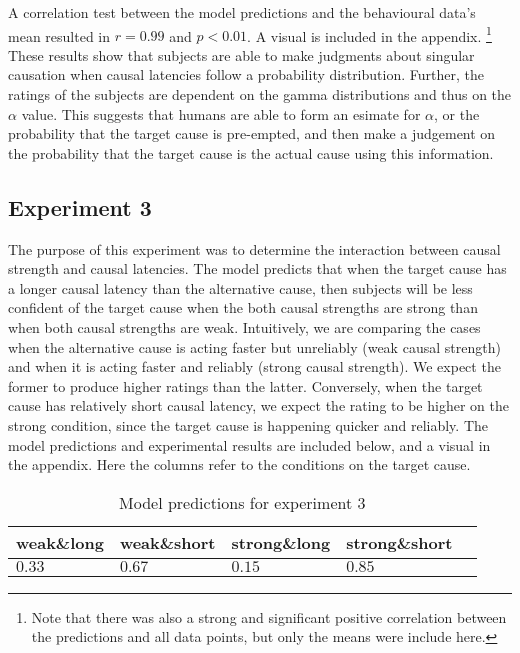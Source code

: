 \documentclass[10pt,letterpaper]{article}
\begin{document}
A correlation test between the model predictions and the behavioural data's mean resulted in $r = 0.99$ and $p < 0.01$. A visual is included
in the appendix.
\footnote{Note that there was also a strong and significant positive correlation between the predictions and all data points, but only the means were include here.}
These results show that subjects are able to make judgments about singular causation when causal latencies follow a probability distribution.
Further, the ratings of the subjects are dependent on the gamma distributions and thus on the $\alpha$ value. This suggests that humans are able to form an esimate for $\alpha$, or the probability that the target cause is pre-empted, and then make a judgement on the
probability that the target cause is the actual cause using this information. 


\subsection{Experiment 3}
The purpose of this experiment was to determine the interaction between causal strength and causal latencies. The model predicts that when the target cause has a longer
causal latency than the alternative cause, then subjects will be less confident of the target cause when the both causal strengths are strong than when both causal strengths are weak.
Intuitively, we are comparing the cases when the alternative cause is acting faster but unreliably (weak causal strength) and when it is acting faster and reliably (strong causal strength). We expect the former to produce higher ratings than the latter. Conversely, when the target cause has relatively short causal latency, we expect the rating to be higher on the strong condition, since the target cause is happening quicker and reliably. The model predictions and experimental results are included below, and a visual in the appendix. Here the columns refer to the conditions on the target cause.
 

\begin{table}[H]
\begin{center} 
\caption{Model predictions for experiment 3} 
\label{summary exp1} 
\vskip 0.12in
\begin{tabular}{lllll} 
\toprule
weak\&long&weak\&short&strong\&long&strong\&short\\
\midrule
	$0.33$ & $0.67$ & $0.15$ & $0.85$ \\
\bottomrule
\end{tabular} 
\end{center} 
\end{table}
\end{document}
